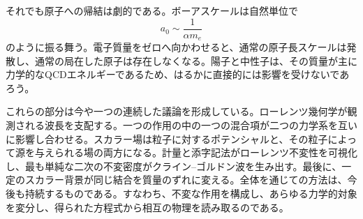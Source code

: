 それでも原子への帰結は劇的である。ボーアスケールは自然単位で
\begin{equation}
a_0\sim\frac{1}{\alpha m_e}
\end{equation}
のように振る舞う。電子質量をゼロへ向かわせると、通常の原子長スケールは発散し、通常の局在した原子は存在しなくなる。陽子と中性子は、その質量が主に力学的なQCDエネルギーであるため、はるかに直接的には影響を受けないであろう。

これらの部分は今や一つの連続した議論を形成している。ローレンツ幾何学が観測される波長を支配する。一つの作用の中の一つの混合項が二つの力学系を互いに影響し合わせる。スカラー場は粒子に対するポテンシャルと、その粒子によって源を与えられる場の両方になる。計量と添字記法がローレンツ不変性を可視化し、最も単純な二次の不変密度がクライン--ゴルドン波を生み出す。最後に、一定のスカラー背景が同じ結合を質量のずれに変える。全体を通じての方法は、今後も持続するものである。すなわち、不変な作用を構成し、あらゆる力学的対象を変分し、得られた方程式から相互の物理を読み取るのである。